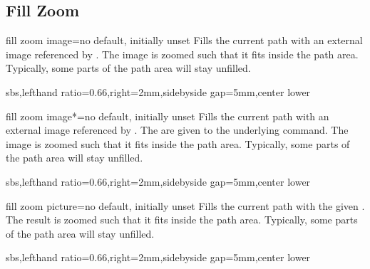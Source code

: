 \documentclass{article}
\newenvironment{dispExample*}[1]{\par}{}
\begin{document}
\clearpage
\subsection{Fill Zoom}
\begin{docTikzKey}{fill zoom image}{=}{no default, initially unset}
  Fills the current path with an external image referenced by .
  The image is zoomed such that it fits inside the path area.
  Typically, some parts of the path area will stay unfilled.
\begin{dispExample*}{sbs,lefthand ratio=0.66,right=2mm,sidebyside gap=5mm,center lower}
\end{dispExample*}
\end{docTikzKey}


\begin{docTikzKey}{fill zoom image*}{=}{no default, initially unset}
  Fills the current path with an external image referenced by .
  The  are given to the underlying  command.
  The image is zoomed such that it fits inside the path area.
  Typically, some parts of the path area will stay unfilled.
\begin{dispExample*}{sbs,lefthand ratio=0.66,right=2mm,sidebyside gap=5mm,center lower}
\end{dispExample*}
\end{docTikzKey}


\begin{docTikzKey}{fill zoom picture}{=}{no default, initially unset}
  Fills the current path with the given .
  The result is zoomed such that it fits inside the path area.
  Typically, some parts of the path area will stay unfilled.
\begin{dispExample*}{sbs,lefthand ratio=0.66,right=2mm,sidebyside gap=5mm,center lower}
\end{dispExample*}
\end{docTikzKey}
\end{document}
